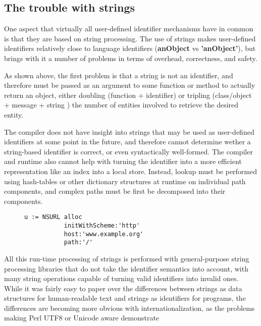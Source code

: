 \documentclass[preprint,authoryear]{acm_proc_article-sp}
\begin{document}
\subsection{The trouble with strings}
\label{stringtrouble}

One aspect that virtually all user-defined identifier mechanisms have in common is that they
are based on string processing.  The use of strings makes user-defined identifiers relatively
close to language identifiers ({\bf \hbox{anObject}} vs {\bf \hbox{'anObject'}}), but brings with it a number of problems in terms of overhead, correctness, and safety.

As shown above, the first problem is that a string is not an identifier, and therefore
must be passed as an argument to some function or method to actually return
 an object, either doubling (function + identifier) or tripling (class/object + message + string ) the number of entities involved to retrieve the desired entity.  

The compiler does not have insight into strings that may be used as user-defined 
identifiers at some point in the future, and therefore cannot determine wether 
a string-based identifier is correct, or even syntactically well-formed.   The compiler
and runtime also cannot help with turning the identifier into a more efficient representation
like an index into a local store.  Instead, lookup must be performed using hash-tables
or other dictionary structures at runtime on individual path components, 
and complex paths must be first be decomposed into their components.

\begin{figure}[htbp]
\begin{lstlisting}[style=L,label=url-as-obj,caption=URL initialized in an object-oriented fashion.]
u := NSURL alloc
           initWithScheme:'http'
           host:'www.example.org'
           path:'/' 
\end{lstlisting}
\end{figure}

All this run-time processing of strings is performed with general-purpose string
processing libraries that do not take the identifier semantics into account, with
many string operations capable of turning valid identifiers into invalid ones.
While it was fairly easy to paper over the differences between strings as 
data structures for human-readable text and strings as identifiers for programs,
the differences are becoming more obvious with internationalization, as the
problems making Perl UTF8 or Unicode aware demonstrate \cite{perl-unicode}
\end{document}
